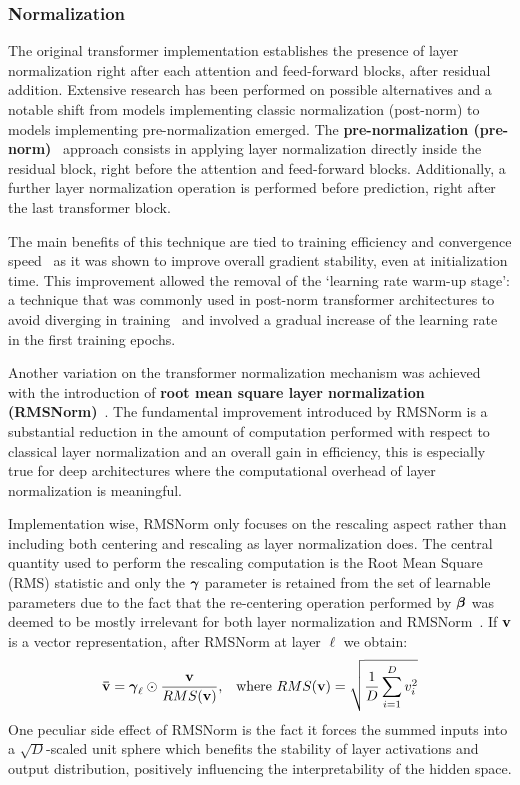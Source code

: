 \subsubsection*{Normalization}

The original transformer implementation establishes the presence of layer normalization right after each attention and feed-forward blocks, after residual addition.
Extensive research has been performed on possible alternatives and a notable shift from models implementing classic normalization (post-norm) to models implementing pre-normalization emerged.
The \textbf{pre-normalization (pre-norm)}~\cite{baevski2019,xiong2020} approach consists in applying layer normalization directly inside the residual block, right before the attention and feed-forward blocks.
Additionally, a further layer normalization operation is performed before prediction, right after the last transformer block.

The main benefits of this technique are tied to training efficiency and convergence speed~\cite{xiong2020} as it was shown to improve overall gradient stability, even at initialization time.
This improvement allowed the removal of the `learning rate warm-up stage': a technique that was commonly used in post-norm transformer architectures to avoid diverging in training~\cite{popel2018} and involved a gradual increase of the learning rate in the first training epochs.

Another variation on the transformer normalization mechanism was achieved with the introduction of \textbf{root mean square layer normalization (RMSNorm)}~\cite{zhang2019}.
The fundamental improvement introduced by RMSNorm is a substantial reduction in the amount of computation performed with respect to classical layer normalization and an overall gain in efficiency, this is especially true for deep architectures where the computational overhead of layer normalization is meaningful.

Implementation wise, RMSNorm only focuses on the rescaling aspect rather than including both centering and rescaling as layer normalization does.
The central quantity used to perform the rescaling computation is the Root Mean Square (RMS) statistic and only the $\bm{\mathbf{\gamma}}$ parameter is retained from the set of learnable parameters due to the fact that the re-centering operation performed by $\bm{\mathbf{\beta}}$ was deemed to be mostly irrelevant for both layer normalization and RMSNorm~\cite{zhang2019}.
If $\bm{\mathbf{v}}$ is a vector representation, after RMSNorm at layer $\ell$ we obtain:
\begin{equation}
    \label{eq:background_rmsnorm}
    \begin{aligned}
        \bm{\mathbf{\bar v}} = \bm{\mathbf{\gamma}}_\ell \odot \frac{\bm{\mathbf{v}}}{RMS(\bm{\mathbf{v}})}, &&
        \text{where}\ RMS(\bm{\mathbf{v}}) = \sqrt{\frac{1}{D}\sum_{i=1}^{D}{v_i^2}}
    \end{aligned}
\end{equation}
One peculiar side effect of RMSNorm is the fact it forces the summed inputs into a \mbox{$\sqrt{D}$-scaled} unit sphere which benefits the stability of layer activations and output distribution, positively influencing the interpretability of the hidden space.


